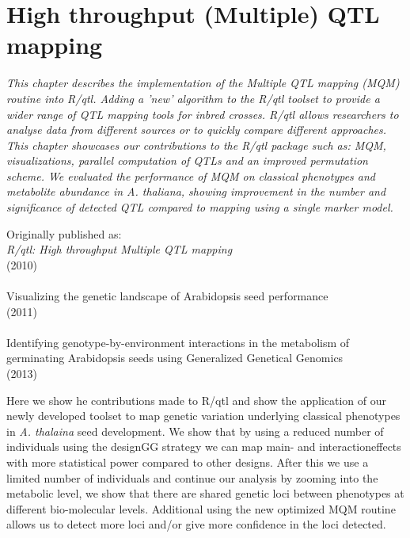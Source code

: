 \chapter{High throughput (Multiple) QTL mapping}
\thispagestyle{empty}
\label{chap:mqm}

\emph{This chapter describes the implementation of the Multiple QTL mapping (MQM) 
routine into R/qtl. Adding a 'new' algorithm to the R/qtl toolset to provide a wider range of 
QTL mapping tools for inbred crosses. R/qtl allows researchers to analyse data from different 
sources or to quickly compare different approaches. This chapter showcases our contributions 
to the R/qtl package such as: MQM, visualizations, parallel computation of QTLs and an improved 
permutation scheme. We evaluated the performance of MQM on classical phenotypes and metabolite 
abundance in A. thaliana, showing improvement in the number and significance of detected QTL 
compared to mapping using a single marker model. }
\null
\vfill

\begin{myexampleblock}{Originally published as:}
  \\
  \emph{R/qtl: High throughput Multiple QTL mapping}\\
   (2010) \\

  \\
  Visualizing the genetic landscape of Arabidopsis seed performance\\
   (2011)\\

  \\
  Identifying genotype-by-environment interactions in the metabolism of germinating Arabidopsis seeds using 
  Generalized Genetical Genomics\\
   (2013)
\end{myexampleblock}

\newpage

Here we show he contributions made to R/qtl and show the application of our newly developed toolset 
to map genetic variation underlying classical phenotypes in \emph{A. thalaina} seed development. We 
show that by using a reduced number of individuals using the designGG strategy we can map main- and 
interactioneffects with more statistical power compared to other designs. After this we use a limited 
number of individuals and continue our analysis by zooming into the metabolic level, we show that 
there are shared genetic loci between phenotypes at different bio-molecular levels. Additional using 
the new optimized MQM routine allows us to detect more loci and/or give more confidence in the loci 
detected.

